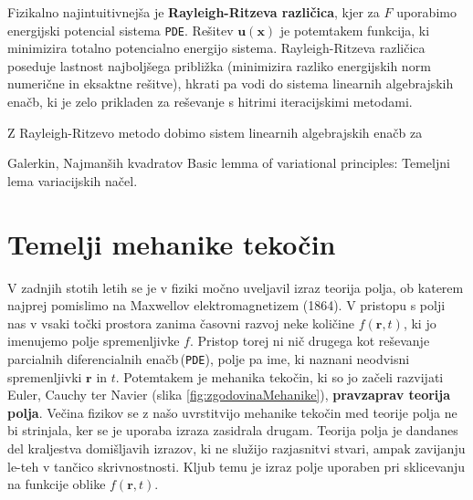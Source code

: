 \documentclass[11pt,a4paper,notitlepage]{article}%
\begin{document}
	Fizikalno najintuitivnejša je \textbf{Rayleigh-Ritzeva različica}, kjer za $F$ uporabimo energijski potencial sistema \texttt{PDE}. Rešitev $\mathbf{u}(\mathbf{x})$ je potemtakem funkcija, ki minimizira totalno potencialno energijo sistema. Rayleigh-Ritzeva različica poseduje lastnost najboljšega približka (minimizira razliko energijskih norm numerične in eksaktne rešitve), hkrati pa vodi do sistema linearnih algebrajskih enačb, ki je zelo prikladen za reševanje s hitrimi iteracijskimi metodami.
	
	Z Rayleigh-Ritzevo metodo dobimo sistem linearnih algebrajskih enačb za 
	
	Galerkin, Najmanših kvadratov \cite{JiangB-LSFEM}
	Basic lemma of variational principles: Temeljni lema variacijskih načel.


	\section{Temelji mehanike tekočin}
		V zadnjih stotih letih se je v fiziki močno uveljavil izraz teorija polja, ob katerem najprej pomislimo na Maxwellov elektromagnetizem (1864). V pristopu s polji nas v vsaki točki prostora zanima časovni razvoj neke količine $f(\mathbf{r},t)$, ki jo imenujemo polje spremenljivke $f$. Pristop torej ni nič drugega kot reševanje parcialnih diferencialnih enačb\,(\texttt{PDE}), polje pa ime, ki naznani neodvisni spremenljivki $\mathbf{r}$ in $t$. Potemtakem je mehanika tekočin, ki so jo začeli razvijati Euler, Cauchy ter Navier (slika \ref{fig:zgodovinaMehanike}), \textbf{pravzaprav teorija polja}. Večina fizikov se z našo uvrstitvijo mehanike tekočin med teorije polja ne bi strinjala, ker se je uporaba izraza zasidrala drugam. Teorija polja je dandanes del kraljestva domišljavih izrazov, ki ne služijo razjasnitvi stvari, ampak zavijanju le-teh v tančico skrivnostnosti. Kljub temu je izraz polje uporaben pri sklicevanju na funkcije oblike $f(\mathbf{r},t)$.
		
\end{document}
